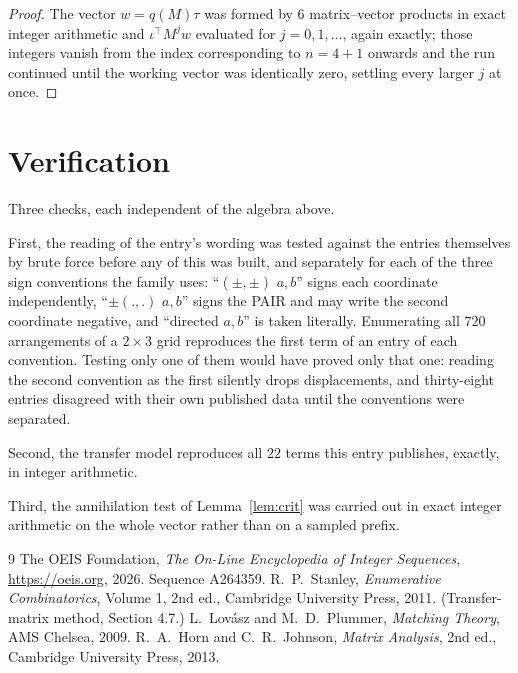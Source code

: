 \documentclass[11pt,a4paper]{article}
\theoremstyle{plain}
\theoremstyle{definition}
\begin{document}
\begin{proof}
The vector $w=q(M)\tau$ was formed by $6$ matrix--vector products in exact integer
arithmetic and $\iota^{\!\top}M^{j}w$ evaluated for $j=0,1,\dots$, again exactly; those
integers vanish from the index corresponding to $n=4+1$ onwards and the run continued
until the working vector was identically zero, settling every larger $j$ at once.
\end{proof}

\section{Verification}

Three checks, each independent of the algebra above.

First, the reading of the entry's wording was tested against the entries themselves by brute
force before any of this was built, and separately for each of the three sign conventions the
family uses: ``$(\pm,\pm)$ $a,b$'' signs each coordinate independently, ``$\pm(.,.)$ $a,b$''
signs the PAIR and may write the second coordinate negative, and ``directed $a,b$'' is taken
literally. Enumerating all $720$ arrangements of a $2\times3$ grid reproduces the first term
of an entry of each convention. Testing only one of them would have proved only that one:
reading the second convention as the first silently drops displacements, and thirty-eight
entries disagreed with their own published data until the conventions were separated.

Second, the transfer model reproduces all $22$ terms this entry publishes, exactly, in
integer arithmetic.

Third, the annihilation test of Lemma~\ref{lem:crit} was carried out in exact integer
arithmetic on the whole vector rather than on a sampled prefix.

\begin{thebibliography}{9}
 The OEIS Foundation, \emph{The On-Line Encyclopedia of Integer
Sequences}, \url{https://oeis.org}, 2026. Sequence A264359.
 R.~P.~Stanley, \emph{Enumerative Combinatorics}, Volume 1, 2nd ed.,
Cambridge University Press, 2011. (Transfer-matrix method, Section 4.7.)
 L.~Lov\'asz and M.~D.~Plummer, \emph{Matching Theory}, AMS Chelsea, 2009.
 R.~A.~Horn and C.~R.~Johnson, \emph{Matrix Analysis}, 2nd ed., Cambridge
University Press, 2013.
\end{thebibliography}
\end{document}
